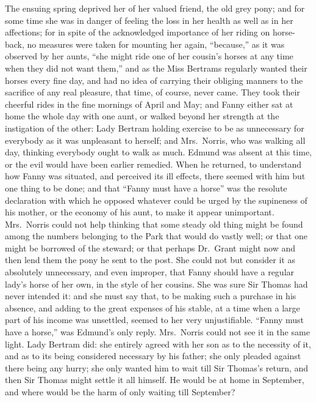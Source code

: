 The ensuing spring deprived her of her valued friend,
the old grey pony; and for some time she was in danger of
feeling the loss in her health as well as in her affections;
for in spite of the acknowledged importance of her riding
on horse-back, no measures were taken for mounting
her again, ``because,'' as it was observed by her aunts,
``she might ride one of her cousin's horses at any time
when they did not want them,'' and as the Miss Bertrams
regularly wanted their horses every fine day, and had no
idea of carrying their obliging manners to the sacrifice
of any real pleasure, that time, of course, never came.
They took their cheerful rides in the fine mornings
of April and May; and Fanny either sat at home the whole
day with one aunt, or walked beyond her strength at the
instigation of the other:  Lady Bertram holding exercise
to be as unnecessary for everybody as it was unpleasant
to herself; and Mrs.\ Norris, who was walking all day,
thinking everybody ought to walk as much.  Edmund was absent
at this time, or the evil would have been earlier remedied.
When he returned, to understand how Fanny was situated,
and perceived its ill effects, there seemed with him but
one thing to be done; and that ``Fanny must have a horse''
was the resolute declaration with which he opposed
whatever could be urged by the supineness of his mother,
or the economy of his aunt, to make it appear unimportant.
Mrs.\ Norris could not help thinking that some steady
old thing might be found among the numbers belonging
to the Park that would do vastly well; or that one might
be borrowed of the steward; or that perhaps Dr.\ Grant
might now and then lend them the pony he sent to the post.
She could not but consider it as absolutely unnecessary,
and even improper, that Fanny should have a regular
lady's horse of her own, in the style of her cousins.
She was sure Sir Thomas had never intended it:  and she
must say that, to be making such a purchase in his absence,
and adding to the great expenses of his stable,
at a time when a large part of his income was unsettled,
seemed to her very unjustifiable.  ``Fanny must have
a horse,'' was Edmund's only reply.  Mrs.\ Norris could
not see it in the same light.  Lady Bertram did:
she entirely agreed with her son as to the necessity of it,
and as to its being considered necessary by his father;
she only pleaded against there being any hurry; she only
wanted him to wait till Sir Thomas's return, and then Sir
Thomas might settle it all himself.  He would be at home
in September, and where would be the harm of only waiting
till September?

